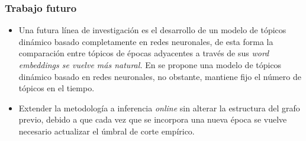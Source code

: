 \documentclass[
	spanish, %
	aspectratio=43, %
	hyperref={pdfencoding=auto,psdextra},
	xcolor={dvipsnames,table,usenames},
]{beamer}
\begin{document}
\begin{frame}
\frametitle{Trabajo futuro}

\begin{itemize}
  \item Una futura línea de investigación es el desarrollo de un modelo de tópicos dinámico basado completamente en redes neuronales, de esta forma la comparación entre tópicos de épocas adyacentes a través de sus \textit{word embeddings se vuelve más natural.} En \cite{dieng2019dynamic} se propone una modelo de tópicos dinámico basado en redes neuronales, no obstante, mantiene fijo el número de tópicos en el tiempo.
  \item Extender la metodología a inferencia \textit{online} sin alterar la estructura del grafo previo, debido a que cada vez que se incorpora una nueva época se vuelve necesario actualizar el úmbral de corte empírico.
\end{itemize}

\end{frame}


\begin{frame}[allowframebreaks]\normalsize
\frametitle{\namereferences}

\end{frame}
\end{document}
